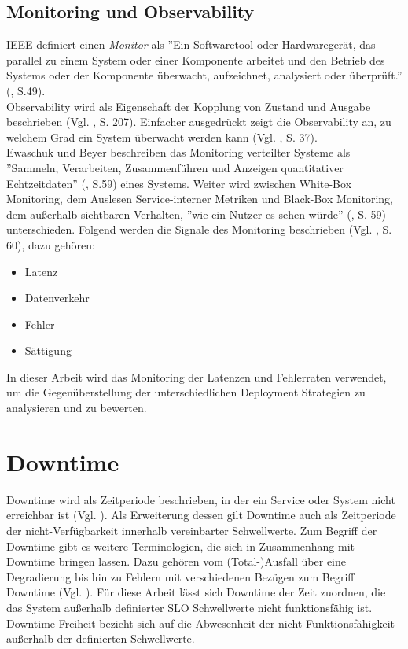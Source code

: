 \documentclass[
12pt,
a4paper,
twoside,
openright
]{report}
\begin{document}
	\subsection{Monitoring und Observability}
	IEEE definiert einen \textit{Monitor} als ''Ein Softwaretool oder Hardwaregerät,
	das parallel zu einem System oder einer Komponente arbeitet und den Betrieb des Systems oder der Komponente überwacht, aufzeichnet, analysiert oder überprüft.'' (\cite{IEEETerms}, S.49).
	\\
	Observability wird als Eigenschaft der Kopplung von Zustand und Ausgabe beschrieben (Vgl. \parencite{gopal1993modern}, S. 207). Einfacher ausgedrückt zeigt die Observability an, zu welchem Grad ein System überwacht werden kann (Vgl. \parencite{SinaObservAndMon}, S. 37).
	\\
	Ewaschuk und Beyer beschreiben das Monitoring verteilter Systeme als ''Sammeln, Verarbeiten, Zusammenführen und Anzeigen quantitativer Echtzeitdaten''  (\cite{GoogleSRE}, S.59) eines Systems. Weiter wird zwischen White-Box Monitoring, dem Auslesen Service-interner Metriken und Black-Box Monitoring, dem außerhalb sichtbaren Verhalten, ''wie ein Nutzer es sehen würde''  (\cite{GoogleSRE}, S. 59) unterschieden. Folgend werden die Signale des Monitoring beschrieben	(Vgl. \parencite{GoogleSRE}, S. 60), dazu gehören:
	\begin{itemize}
		\item Latenz
		\item Datenverkehr
		\item Fehler
		\item Sättigung
	\end{itemize}

	In dieser Arbeit wird das Monitoring der Latenzen und Fehlerraten verwendet, um die Gegenüberstellung der unterschiedlichen Deployment Strategien zu analysieren und zu bewerten. 

	\section{Downtime}
	Downtime wird als Zeitperiode beschrieben, in der ein Service oder System nicht erreichbar ist (Vgl. \parencite{SRESchoolDownt}). Als Erweiterung dessen gilt Downtime auch als Zeitperiode der nicht-Verfügbarkeit innerhalb vereinbarter Schwellwerte. Zum Begriff der Downtime gibt es weitere Terminologien, die sich in Zusammenhang mit Downtime bringen lassen. Dazu gehören vom  (Total-)Ausfall über eine Degradierung bis hin zu Fehlern mit verschiedenen Bezügen zum Begriff Downtime (Vgl. \parencite{SRESchoolDownt}).
	Für diese Arbeit lässt sich Downtime der Zeit zuordnen, die das System außerhalb definierter SLO Schwellwerte nicht funktionsfähig ist. Downtime-Freiheit bezieht sich auf die Abwesenheit der nicht-Funktionsfähigkeit außerhalb der definierten Schwellwerte. 
	
\end{document}
